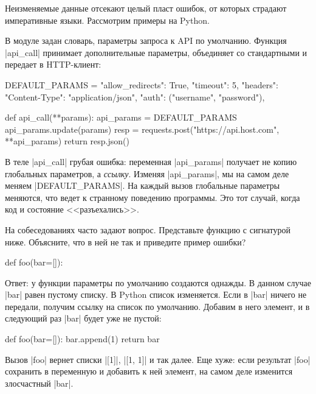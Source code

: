 Неизменяемые данные отсекают целый пласт ошибок, от которых страдают
императивные языки. Рассмотрим примеры на Python.

В модуле задан словарь, параметры запроса к API по умолчанию. Функция
\spverb|api_call| принимает дополнительные параметры, объединяет со стандартными
и передает в HTTP-клиент:

\begin{english}
  \begin{python}
DEFAULT_PARAMS = {
    "allow_redirects": True,
    "timeout": 5,
    "headers": {"Content-Type": "application/json"},
    "auth": ("username", "password"),
}

def api_call(**params):
    api_params = DEFAULT_PARAMS
    api_params.update(params)
    resp = requests.post("https://api.host.com", **api_params)
    return resp.json()
  \end{python}
\end{english}

В теле \spverb|api_call| грубая ошибка: переменная \spverb|api_params| получает
не копию глобальных параметров, а \emph{ссылку}. Изменяя \spverb|api_params|, мы
на самом деле меняем \spverb|DEFAULT_PARAMS|. На каждый вызов глобальные
параметры меняются, что ведет к странному поведению программы. Это тот случай,
когда код и состояние <<разъехались>>.

На собеседованиях часто задают вопрос. Представьте функцию с сигнатурой
ниже. Объясните, что в ней не так и приведите пример ошибки?

\begin{english}
  \begin{python}
def foo(bar=[]):
  \end{python}
\end{english}

Ответ: у функции параметры по умолчанию создаются однажды. В данном случае
\spverb|bar| равен пустому списку. В Python список изменяется. Если в
\spverb|bar| ничего не передали, получим ссылку на список по умолчанию. Добавим
в него элемент, и в следующий раз \spverb|bar| будет уже не пустой:

\begin{english}
  \begin{python}
def foo(bar=[]):
    bar.append(1)
    return bar
  \end{python}
\end{english}

Вызов \spverb|foo| вернет списки \spverb|[1]|, \spverb|[1, 1]| и так далее. Еще
хуже: если результат \spverb|foo| сохранить в переменную и добавить к ней
элемент, на самом деле изменится злосчастный \spverb|bar|.


